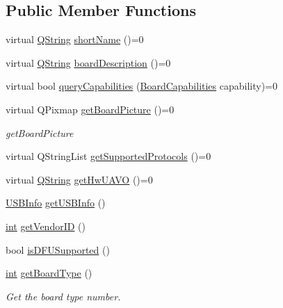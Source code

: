 \subsection*{Public Member Functions}
\begin{DoxyCompactItemize}
\item 
virtual \hyperlink{group___u_a_v_objects_plugin_gab9d252f49c333c94a72f97ce3105a32d}{Q\-String} \hyperlink{group___core_plugin_gab7a5ac1921113d9ab3a8181acb704c08}{short\-Name} ()=0
\item 
virtual \hyperlink{group___u_a_v_objects_plugin_gab9d252f49c333c94a72f97ce3105a32d}{Q\-String} \hyperlink{group___core_plugin_gad4ab160d20fd133acd9df87eaa398e8f}{board\-Description} ()=0
\item 
virtual bool \hyperlink{group___core_plugin_gac4aef79d19d7ee487afee6655808e722}{query\-Capabilities} (\hyperlink{group___core_plugin_ga01b09218f2a13aaeee6db007ac6bd967}{Board\-Capabilities} capability)=0
\item 
virtual Q\-Pixmap \hyperlink{group___core_plugin_gaf2965319c1d15dcb3563dd224add7858}{get\-Board\-Picture} ()=0
\begin{DoxyCompactList}\small\item\em get\-Board\-Picture \end{DoxyCompactList}\item 
virtual Q\-String\-List \hyperlink{group___core_plugin_ga01b18f940069cc5cdc9bfc42fef2854a}{get\-Supported\-Protocols} ()=0
\item 
virtual \hyperlink{group___u_a_v_objects_plugin_gab9d252f49c333c94a72f97ce3105a32d}{Q\-String} \hyperlink{group___core_plugin_ga265636c3ae87d360bcddaa13cf4d2ce4}{get\-Hw\-U\-A\-V\-O} ()=0
\item 
\hyperlink{struct_core_1_1_i_board_type_1_1_u_s_b_info}{U\-S\-B\-Info} \hyperlink{group___core_plugin_ga5a5ae8e61aae6fb70f4557df2c6e49dc}{get\-U\-S\-B\-Info} ()
\item 
\hyperlink{ioapi_8h_a787fa3cf048117ba7123753c1e74fcd6}{int} \hyperlink{group___core_plugin_ga6d8beb4c61fcb291ecef7dbdb8785d9f}{get\-Vendor\-I\-D} ()
\item 
bool \hyperlink{group___core_plugin_ga5a4a5e1306420d52d03a2a45ba9af280}{is\-D\-F\-U\-Supported} ()
\item 
\hyperlink{ioapi_8h_a787fa3cf048117ba7123753c1e74fcd6}{int} \hyperlink{group___core_plugin_ga5d2ecfabe310535314afc68f856c06bf}{get\-Board\-Type} ()
\begin{DoxyCompactList}\small\item\em Get the board type number. \end{DoxyCompactList}\end{DoxyCompactItemize}
